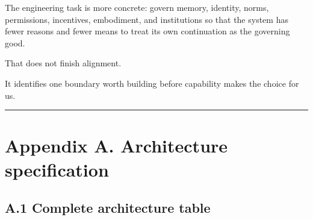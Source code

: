 \documentclass[
  11pt,
]{article}
\begin{document}
The engineering task is more concrete: govern memory, identity, norms,
permissions, incentives, embodiment, and institutions so that the system
has fewer reasons and fewer means to treat its own continuation as the
governing good.

That does not finish alignment.

It identifies one boundary worth building before capability makes the
choice for us.

\begin{center}\rule{0.5\linewidth}{0.5pt}\end{center}

\section{Appendix A. Architecture
specification}\label{appendix-a.-architecture-specification}

\subsection{A.1 Complete architecture
table}\label{a.1-complete-architecture-table}
\end{document}
